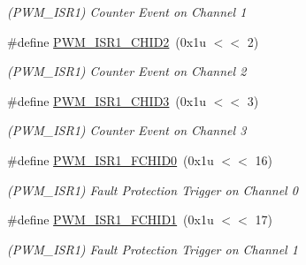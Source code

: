 \begin{DoxyCompactItemize}
\begin{DoxyCompactList}\small\item\em (P\+W\+M\+\_\+\+I\+S\+R1) Counter Event on Channel 1 \end{DoxyCompactList}\item 
\mbox{\label{group__SAMV71__PWM_ga877d53e5a7f56b6fa1a120a152504a75}} 
\#define \mbox{\hyperlink{group__SAMV71__PWM_ga877d53e5a7f56b6fa1a120a152504a75}{P\+W\+M\+\_\+\+I\+S\+R1\+\_\+\+C\+H\+I\+D2}}~(0x1u $<$$<$ 2)
\begin{DoxyCompactList}\small\item\em (P\+W\+M\+\_\+\+I\+S\+R1) Counter Event on Channel 2 \end{DoxyCompactList}\item 
\mbox{\label{group__SAMV71__PWM_gaa9bfd7b941b6dd602ec557c93b048b7c}} 
\#define \mbox{\hyperlink{group__SAMV71__PWM_gaa9bfd7b941b6dd602ec557c93b048b7c}{P\+W\+M\+\_\+\+I\+S\+R1\+\_\+\+C\+H\+I\+D3}}~(0x1u $<$$<$ 3)
\begin{DoxyCompactList}\small\item\em (P\+W\+M\+\_\+\+I\+S\+R1) Counter Event on Channel 3 \end{DoxyCompactList}\item 
\mbox{\label{group__SAMV71__PWM_ga57d6aa67fe3a37f1fa0ab36d04be164f}} 
\#define \mbox{\hyperlink{group__SAMV71__PWM_ga57d6aa67fe3a37f1fa0ab36d04be164f}{P\+W\+M\+\_\+\+I\+S\+R1\+\_\+\+F\+C\+H\+I\+D0}}~(0x1u $<$$<$ 16)
\begin{DoxyCompactList}\small\item\em (P\+W\+M\+\_\+\+I\+S\+R1) Fault Protection Trigger on Channel 0 \end{DoxyCompactList}\item 
\mbox{\label{group__SAMV71__PWM_ga440b312b3cdf88e66ac626741fbc5427}} 
\#define \mbox{\hyperlink{group__SAMV71__PWM_ga440b312b3cdf88e66ac626741fbc5427}{P\+W\+M\+\_\+\+I\+S\+R1\+\_\+\+F\+C\+H\+I\+D1}}~(0x1u $<$$<$ 17)
\begin{DoxyCompactList}\small\item\em (P\+W\+M\+\_\+\+I\+S\+R1) Fault Protection Trigger on Channel 1 \end{DoxyCompactList}\item 
\mbox{\label{group__SAMV71__PWM_gaff4258f3fafae81aa9d871e8bf9d656e}} 

\end{DoxyCompactItemize}
